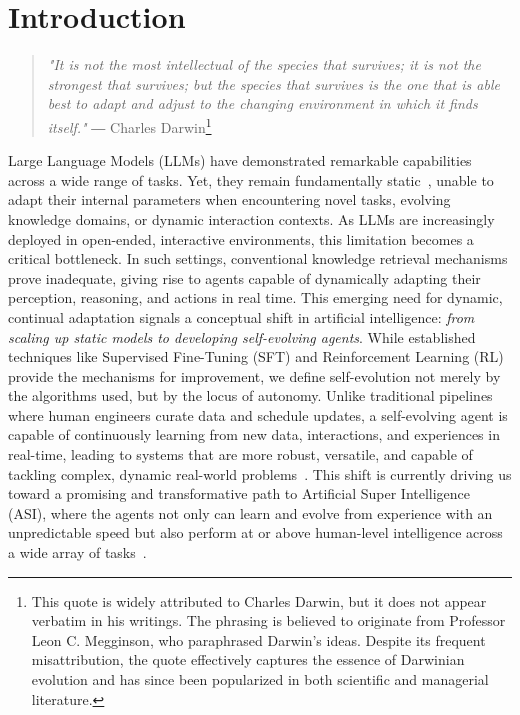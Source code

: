 \section{Introduction}

\begin{quote}
\textit{"It is not the most intellectual of the species that survives; it is not the strongest that survives; but the species that survives is the one that is able best to adapt and adjust to the changing environment in which it finds itself."}
\hspace{5cm} ― Charles Darwin\footnote{This quote is widely attributed to Charles Darwin, but it does not appear verbatim in his writings. The phrasing is believed to originate from Professor Leon C. Megginson, who paraphrased Darwin’s ideas. Despite its frequent misattribution, the quote effectively captures the essence of Darwinian evolution and has since been popularized in both scientific and managerial literature. } 
\end{quote}


Large Language Models (LLMs) have demonstrated remarkable capabilities across a wide range of tasks. Yet, they remain fundamentally static~\citep{luo2025largelanguagemodelagent}, unable to adapt their internal parameters when encountering novel tasks, evolving knowledge domains, or dynamic interaction contexts. As LLMs are increasingly deployed in open-ended, interactive environments, this limitation becomes a critical bottleneck. In such settings, conventional knowledge retrieval mechanisms prove inadequate, giving rise to agents capable of dynamically adapting their perception, reasoning, and actions in real time. This emerging need for dynamic, continual adaptation signals a conceptual shift in artificial intelligence: \textit{from scaling up static models to developing self-evolving agents}.
While established techniques like Supervised Fine-Tuning (SFT) and Reinforcement Learning (RL) provide the mechanisms for improvement, we define self-evolution not merely by the algorithms used, but by the locus of autonomy. Unlike traditional pipelines where human engineers curate data and schedule updates, a self-evolving agent is capable of continuously learning from new data, interactions, and experiences in real-time, leading to systems that are more robust, versatile, and capable of tackling complex, dynamic real-world problems~\citep{tool_tut}.
This shift is currently driving us toward a promising and transformative path to Artificial Super Intelligence (ASI), where the agents not only can learn and evolve from experience with an unpredictable speed but also perform at or above human-level intelligence across a wide array of tasks~\citep{wang2025theoryagentstoolusedecisionmakers}.

